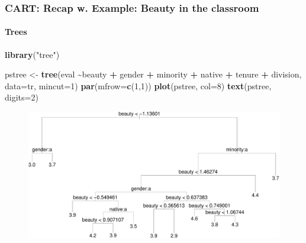 \documentclass[
  shownotes,
  xcolor={svgnames},
  hyperref={colorlinks,citecolor=DarkBlue,linkcolor=DarkRed,urlcolor=DarkBlue}
  , aspectratio=169]{beamer}
\newenvironment{Shaded}{\begin{snugshade}}{\end{snugshade}}
\newcommand{\DataTypeTok}[1]{\textcolor[rgb]{0.13,0.29,0.53}{#1}}
\newcommand{\DecValTok}[1]{\textcolor[rgb]{0.00,0.00,0.81}{#1}}
\newcommand{\KeywordTok}[1]{\textcolor[rgb]{0.13,0.29,0.53}{\textbf{#1}}}
\newcommand{\NormalTok}[1]{#1}
\newcommand{\OperatorTok}[1]{\textcolor[rgb]{0.81,0.36,0.00}{\textbf{#1}}}
\newcommand{\StringTok}[1]{\textcolor[rgb]{0.31,0.60,0.02}{#1}}
\begin{document}
\begin{frame}[fragile]
\frametitle{CART: Recap w. Example: Beauty in the classroom}
\framesubtitle{Trees}

\begin{scriptsize}
\begin{Shaded}
\begin{Highlighting}[]
\KeywordTok{library}\NormalTok{(}\StringTok{"tree"}\NormalTok{)}

\NormalTok{pstree \textless{}{-}}\StringTok{ }\KeywordTok{tree}\NormalTok{(eval }\OperatorTok{\textasciitilde{}}\NormalTok{beauty }\OperatorTok{+}\StringTok{ }\NormalTok{gender }\OperatorTok{+}\StringTok{ }\NormalTok{minority }\OperatorTok{+}\StringTok{ }\NormalTok{native }\OperatorTok{+}\StringTok{ }\NormalTok{tenure }\OperatorTok{+}\StringTok{ }\NormalTok{division, }\DataTypeTok{data=}\NormalTok{tr, }\DataTypeTok{mincut=}\DecValTok{1}\NormalTok{)}
\KeywordTok{par}\NormalTok{(}\DataTypeTok{mfrow=}\KeywordTok{c}\NormalTok{(}\DecValTok{1}\NormalTok{,}\DecValTok{1}\NormalTok{))}
\KeywordTok{plot}\NormalTok{(pstree, }\DataTypeTok{col=}\DecValTok{8}\NormalTok{)}
\KeywordTok{text}\NormalTok{(pstree, }\DataTypeTok{digits=}\DecValTok{2}\NormalTok{)}
\end{Highlighting}
\end{Shaded}
\end{scriptsize}

\begin{figure}[H] \centering
            \captionsetup{justification=centering}
              \includegraphics[scale=0.4]{figures/unnamed-chunk-3-1.pdf}              
 \end{figure}

\end{frame}
\end{document}
